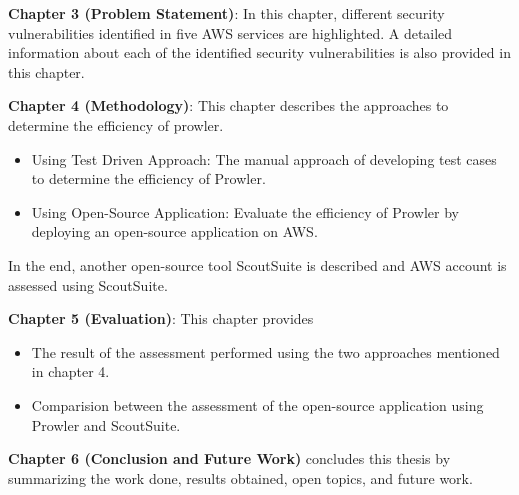 \par \textbf{Chapter 3 (Problem Statement)}: In this chapter, different security vulnerabilities identified in five
AWS services are highlighted. A detailed information about each of the identified security vulnerabilities is also
provided in this chapter.
\par \textbf{Chapter 4 (Methodology)}: This chapter describes the approaches to determine the efficiency of prowler.
\begin{itemize}
    \item Using Test Driven Approach: The manual approach of developing test cases to determine the efficiency of Prowler.
\end{itemize}
\begin{itemize}
    \item Using Open-Source Application: Evaluate the efficiency of Prowler by deploying an open-source
    application on AWS.
\end{itemize}
\par In the end, another open-source tool ScoutSuite is described and AWS account is assessed using ScoutSuite.

\par \textbf{Chapter 5 (Evaluation)}: This chapter provides
\begin{itemize}
    \item The result of the assessment performed using the two approaches mentioned in chapter 4.
\end{itemize}
\begin{itemize}
    \item Comparision between the assessment of the open-source application using Prowler and ScoutSuite.
\end{itemize}
\par \textbf{Chapter 6 (Conclusion and Future Work)} concludes this thesis by summarizing the work done, results obtained, open topics, and future work.


